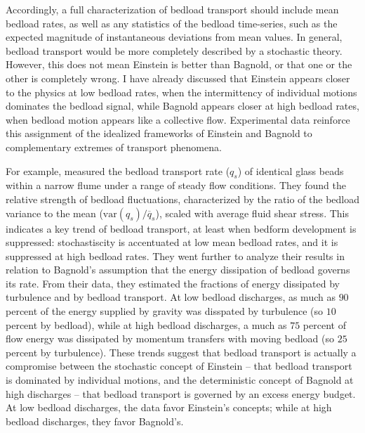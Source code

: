 \documentclass{article}
\begin{document}
Accordingly, a full characterization of bedload transport should include mean bedload rates, as well as any statistics of the bedload time-series, such as the expected magnitude of instantaneous deviations from mean values. 
In general, bedload transport would be more completely described by a stochastic theory. 
However, this does not mean Einstein is better than Bagnold, or that one or the other is completely wrong.
I have already discussed that Einstein appears closer to the physics at low bedload rates, when the intermittency of individual motions dominates the bedload signal, while Bagnold appears closer at high bedload rates, when bedload motion appears like a collective flow. 
Experimental data reinforce this assignment of the idealized frameworks of Einstein and Bagnold to complementary extremes of transport phenomena. 

For example, \citet{Ancey2008} measured the bedload transport rate ($q_s$) of identical glass beads within a narrow flume under a range of steady flow conditions. 
They found the relative strength of bedload fluctuations, characterized by the ratio of the bedload variance to the mean ($\text{var}(q_s)/\overline{q}_s$), scaled with average fluid shear stress. 
This indicates a key trend of bedload transport, at least when bedform development is suppressed: stochastiscity is accentuated at low mean bedload rates, and it is suppressed at high bedload rates. 
They went further to analyze their results in relation to Bagnold's assumption that the energy dissipation of bedload governs its rate. 
From their data, they estimated the fractions of energy dissipated by turbulence and by bedload transport. 
At low bedload discharges, as much as $90$ percent of the energy supplied by gravity was disspated by turbulence (so $10$ percent by bedload), while at high bedload discharges, a much as $75$ percent of  flow energy was dissipated by momentum transfers with moving bedload (so $25$ percent by turbulence).
These trends suggest that bedload transport is actually a compromise between the stochastic concept of Einstein -- that bedload transport is dominated by individual motions, and the deterministic concept of Bagnold at high discharges -- that bedload transport is governed by an excess energy budget.
At low bedload discharges, the data favor Einstein's concepts; while at high bedload discharges, they favor Bagnold's.  
 
\end{document}
